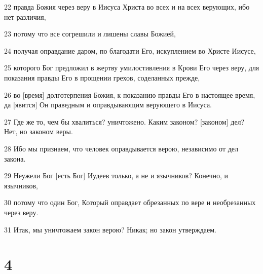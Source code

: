 \par 22 правда Божия через веру в Иисуса Христа во всех и на всех верующих, ибо нет различия,
\par 23 потому что все согрешили и лишены славы Божией,
\par 24 получая оправдание даром, по благодати Его, искуплением во Христе Иисусе,
\par 25 которого Бог предложил в жертву умилостивления в Крови Его через веру, для показания правды Его в прощении грехов, соделанных прежде,
\par 26 во [время] долготерпения Божия, к показанию правды Его в настоящее время, да [явится] Он праведным и оправдывающим верующего в Иисуса.
\par 27 Где же то, чем бы хвалиться? уничтожено. Каким законом? [законом] дел? Нет, но законом веры.
\par 28 Ибо мы признаем, что человек оправдывается верою, независимо от дел закона.
\par 29 Неужели Бог [есть Бог] Иудеев только, а не и язычников? Конечно, и язычников,
\par 30 потому что один Бог, Который оправдает обрезанных по вере и необрезанных через веру.
\par 31 Итак, мы уничтожаем закон верою? Никак; но закон утверждаем.

\chapter{4}

